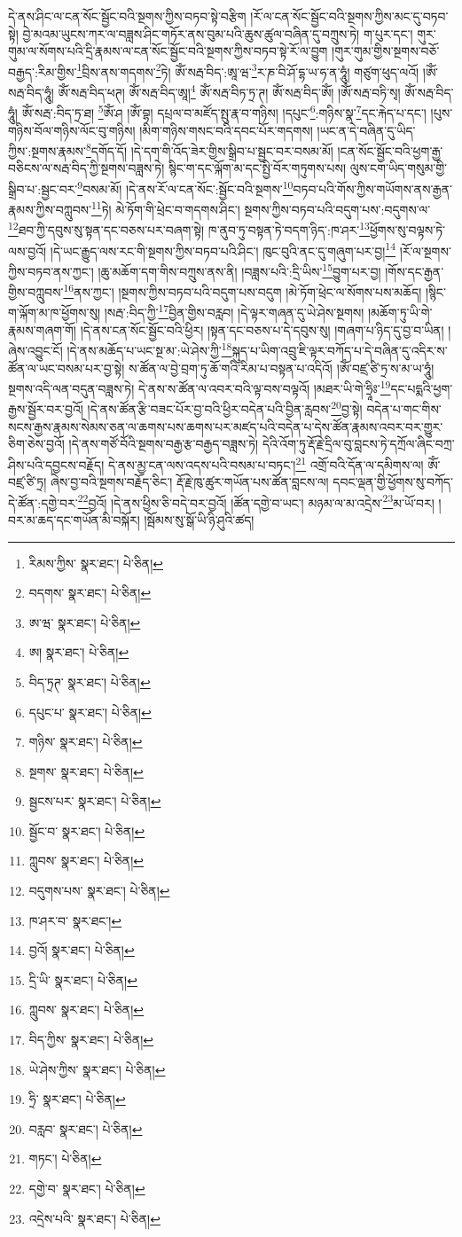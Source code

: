 དེ་ནས་ཤིང་ལ་ངན་སོང་སྦྱོང་བའི་སྔགས་ཀྱིས་བཏབ་སྟེ་བརྩིག །རོ་ལ་ངན་སོང་སྦྱོང་བའི་སྔགས་ཀྱིས་མང་དུ་བཏབ་སྟེ། བྱེ་མའམ་ཡུངས་ཀར་ལ་བཟླས་ཤིང་གཏོར་ནས་བུམ་པའི་ཆུས་ཚུལ་བཞིན་དུ་བཀྲུས་ཏེ། ག་པུར་དང་། གུར་གུམ་ལ་སོགས་པའི་དྲི་རྣམས་ལ་ངན་སོང་སྦྱོང་བའི་སྔགས་ཀྱིས་བཏབ་སྟེ་རོ་ལ་བྱུག །གུར་གུམ་གྱིས་སྔགས་བཅོ་བརྒྱད་:རིམ་གྱིས་\footnote{རིམས་ཀྱིས་  སྣར་ཐང་།  པེ་ཅིན། }བྲིས་ནས་གདགས་\footnote{བདགས་  སྣར་ཐང་།  པེ་ཅིན། }ཏེ། ཨོཾ་སརྦ་བིད་:ཨཱ་ཝ་\footnote{ཨ་ཝ་  སྣར་ཐང་།  པེ་ཅིན། }ར་ཎ་བི་ཤོ་དྷ་ཡ་ཧ་ན་ཧཱུཾ། གཙུག་ཕུད་ལའོ། །ཨོཾ་སརྦ་བིད་ཧཱུཾ། ཨོཾ་སརྦ་བིད་ཕཊ། ཨོཾ་སརྦ་བིད་ཨཱ།\footnote{ཨ།  སྣར་ཐང་།  པེ་ཅིན། } ཨོཾ་སརྦ་བིཏ་ཏྲ་ཊ། ཨོཾ་སརྦ་བིད་ཨོཾ། །ཨོཾ་སརྦ་བཏི་སྭ། ཨོཾ་སརྦ་བིད་ཧཱུཾ། ཨོཾ་སརྦ་:བིད་ཏྲ་ཐ། \footnote{བིད་ཏྲཊ་  སྣར་ཐང་།  པེ་ཅིན། }ཨོཾ་ཤ །ཨོཾ་བྷ། དཔྲལ་བ་མཛོད་སྤུ་རྣ་བ་གཉིས། །དཔུང་\footnote{དཔུང་པ་  སྣར་ཐང་།  པེ་ཅིན། }:གཉིས་སྣ་\footnote{གཉིས་  སྣར་ཐང་།  པེ་ཅིན། }དང་རྐེད་པ་དང་། །པུས་གཉིས་བོལ་གཉིས་ལོང་བུ་གཉིས། །མིག་གཉིས་གསང་བའི་དབང་པོར་གདགས། །ཡང་ན་དེ་བཞིན་དུ་ཡིད་ཀྱིས་:སྔགས་རྣམས་\footnote{སྔགས་  སྣར་ཐང་།  པེ་ཅིན། }དགོད་དོ། །དེ་དག་གི་འོད་ཟེར་གྱིས་སྒྲིབ་པ་སྦྱང་བར་བསམ་མོ། །ངན་སོང་སྦྱོང་བའི་ཕྱག་རྒྱ་བཅིངས་ལ་སརྦ་བིད་ཀྱི་སྔགས་བཟླས་ཏེ། སྙིང་ག་དང་ལྐོག་མ་དང་སྤྱི་བོར་གཏུགས་པས། ལུས་ངག་ཡིད་གསུམ་གྱི་སྒྲིབ་པ་:སྦྱང་བར་\footnote{སྦྱངས་པར་  སྣར་ཐང་།  པེ་ཅིན། }བསམ་མོ། །དེ་ནས་རོ་ལ་ངན་སོང་:སྦྱོང་བའི་སྔགས་\footnote{སྦྱོང་བ་  སྣར་ཐང་།  པེ་ཅིན། }བཏབ་པའི་གོས་ཀྱིས་གཡོགས་ནས་རྒྱན་རྣམས་ཀྱིས་བཀླུབས་\footnote{ཀླུབས་  སྣར་ཐང་།  པེ་ཅིན། }ཏེ། མེ་ཏོག་གི་ཕྲེང་བ་གདགས་ཤིང་། སྔགས་ཀྱིས་བཏབ་པའི་བདུག་པས་:བདུགས་ལ་\footnote{བདུགས་པས་  སྣར་ཐང་།  པེ་ཅིན། }ཐབ་ཀྱི་དབུས་སུ་སྟན་དང་བཅས་པར་བཞག་སྟེ། ཁ་ནུབ་ཏུ་བསྟན་ཏེ་བདག་ཉིད་:ཁ་ཤར་\footnote{ཁ་ཤར་བ་  སྣར་ཐང་། }ཕྱོགས་སུ་བལྟས་ཏེ་ལས་བྱའོ། །དེ་ཡང་རྒྱུད་ལས་རང་གི་སྔགས་ཀྱིས་བཏབ་པའི་ཤིང་། ཁུང་བུའི་ནང་དུ་གཞུག་པར་བྱ།\footnote{བྱའོ།  སྣར་ཐང་།  པེ་ཅིན། } །རོ་ལ་སྔགས་ཀྱིས་བཏབ་ནས་ཀྱང་། །ཆུ་མཆོག་དག་གིས་བཀྲུས་ནས་ནི། །བཟླས་པའི་:དྲི་ཡིས་\footnote{དྲི་ཡི་  སྣར་ཐང་།  པེ་ཅིན། }བྱུག་པར་བྱ། །གོས་དང་རྒྱན་གྱིས་བཀླུབས་\footnote{ཀླུབས་  སྣར་ཐང་།  པེ་ཅིན། }ནས་ཀྱང་། །སྔགས་ཀྱིས་བཏབ་པའི་བདུག་པས་བདུག །མེ་ཏོག་ཕྲེང་ལ་སོགས་པས་མཆོད། །སྙིང་ག་ལྐོག་མ་ཁ་ཕྱོགས་སུ། །སརྦ་:བིད་ཀྱི་\footnote{བིད་ཀྱིས་  སྣར་ཐང་།  པེ་ཅིན། }བྱིན་གྱིས་བརླབ། །དེ་ལྟར་གཞན་དུ་ཡེ་ཤེས་སྔགས། །མཆོག་ཏུ་ཡི་གེ་རྣམས་གཞག་གོ། །དེ་ནས་ངན་སོང་སྦྱོང་བའི་ཕྱིར། །སྟན་དང་བཅས་པ་དེ་དབུས་སུ། །གཞག་པ་ཉིད་དུ་བྱ་བ་ཡིན། །ཞེས་འབྱུང་ངོ། །དེ་ནས་མཆོད་པ་ཡང་སྔ་མ་:ཡེ་ཤེས་ཀྱི་\footnote{ཡེ་ཤེས་ཀྱིས་  སྣར་ཐང་།  པེ་ཅིན། }སྐུད་པ་ཡིག་འབྲུ་ཇི་ལྟར་བཀོད་པ་དེ་བཞིན་དུ་འདིར་ས་ཚོན་ལ་ཡང་བསམ་པར་བྱ་སྟེ། ས་ཚོན་ལ་བྱེ་བྲག་ཏུ་ཆོ་གའི་རིམ་པ་བསྟན་པ་འདིའོ། །ཨོཾ་བཛྲ་ཙི་ཏྲ་ས་མ་ཡ་ཧཱུཾ། སྔགས་འདི་ལན་བདུན་བཟླས་ཏེ། དེ་ནས་ས་ཚོན་ལ་འབར་བའི་ལྟ་བས་བལྟའོ། །མཐར་ཡི་གེ་ཧྲཱིཿ་\footnote{ཧྲི་  སྣར་ཐང་།  པེ་ཅིན། }དང་པདྨའི་ཕྱག་རྒྱས་སྦྱོར་བར་བྱའོ། །དེ་ནས་ཚོན་རྩི་བཟང་པོར་བྱ་བའི་ཕྱིར་བདེན་པའི་བྱིན་རླབས་\footnote{བརླབ་  སྣར་ཐང་།  པེ་ཅིན། }བྱ་སྟེ། བདེན་པ་གང་གིས་སངས་རྒྱས་རྣམས་སེམས་ཅན་ལ་ཆགས་པས་ཆགས་པར་མཛད་པའི་བདེན་པ་དེས་ཚོན་རྣམས་འབར་བར་གྱུར་ཅིག་ཅེས་བྱའོ། །དེ་ནས་གཙོ་བོའི་སྔགས་བརྒྱ་རྩ་བརྒྱད་བཟླས་ཏེ། དེའི་འོག་ཏུ་རྡོ་རྗེ་དྲིལ་བུ་བླངས་ཏེ་དཀྲོལ་ཞིང་བཀྲ་ཤིས་པའི་དབྱངས་བརྗོད། དེ་ནས་མྱ་ངན་ལས་འདས་པའི་བསམ་པ་བཏང་།\footnote{གཏང་།  པེ་ཅིན། } འགྲོ་བའི་དོན་ལ་དམིགས་ལ། ཨོཾ་བཛྲ་ཙི་ཏྲ། ཞེས་བྱ་བའི་སྔགས་བརྗོད་ཅིང་། རྡོ་རྗེ་ཁུ་ཚུར་གཡོན་པས་ཚོན་བླངས་ལ། དབང་ལྡན་གྱི་ཕྱོགས་སུ་བཀོད་དེ་ཚོན་:དགྱེ་བར་\footnote{དགྱེ་བ་  སྣར་ཐང་།  པེ་ཅིན། }བྱའོ། །དེ་ནས་ཕྱིས་ཅི་བདེ་བར་བྱའོ། །ཚོན་དགྱེ་བ་ཡང་། མཉམ་ལ་མ་འདྲེས་\footnote{འདྲེས་པའི་  སྣར་ཐང་།  པེ་ཅིན། }མ་ཡོ་བར། །བར་མ་ཆད་དང་གཡོན་མི་བསྐོར། །སྦོམས་སུ་སྒོ་ཡི་ཉི་ཤུའི་ཚད། 